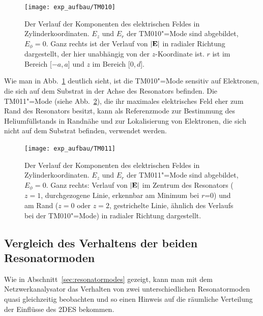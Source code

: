 \begin{figure}[h!tbp] 
	\centerline{\texttt{[image: exp\_aufbau/TM010]}}
	\caption[Modenabhängiger Feldverlauf im Resonator der TM010"=Mode]{Der Verlauf der Komponenten des elektrischen Feldes in Zylinderkoordinaten. $E_z$ und $E_r$ der TM010"=Mode sind abgebildet, $E_\phi=0$. Ganz rechts ist der Verlauf von $\abs{\vec E}$ in radialer Richtung dargestellt, der hier unabhängig von der $z$-Koordinate ist. $r$ ist im Bereich [$-a$,\,$a$] und $z$ im Bereich [$0$,\,$d$]. }
	\label{fig:TM010}
\end{figure}

Wie man in Abb.~\ref{fig:TM010} deutlich sieht, ist die TM010"=Mode sensitiv auf Elektronen, die sich auf dem Substrat in der Achse des Resonators befinden. Die TM011"=Mode (siehe Abb.~\ref{fig:TM011}), die ihr maximales elektrisches Feld eher zum Rand des Resonators besitzt, kann als Referenzmode zur Bestimmung des Heliumfüllstands in Randnähe und zur Lokalisierung von Elektronen, die sich nicht auf dem Substrat befinden, verwendet werden.

\begin{figure}[h!tbp]
	\centerline{\texttt{[image: exp\_aufbau/TM011]}}
	\caption[Modenabhängiger Feldverlauf im Resonator der TM011"=Mode]{Der Verlauf der Komponenten des elektrischen Feldes in Zylinderkoordinaten. $E_z$ und $E_r$ der TM011"=Mode sind abgebildet, $E_\phi=0$. Ganz rechts: Verlauf von $\abs{\vec E}$ im Zentrum des Resonators ($z=1$, durchgezogene Linie, erkennbar am Minimum bei $r$=0) und am Rand ($z=0$ oder $z=2$, gestrichelte Linie, ähnlich des Verlaufs bei der TM010"=Mode) in radialer Richtung dargestellt.}
	\label{fig:TM011}
\end{figure}

\subsection{Vergleich des Verhaltens der beiden Resonatormoden}
Wie in Abschnitt~\ref{sec:resonatormodes} gezeigt, kann man mit dem Netzwerkanalysator das Verhalten von zwei unterschiedlichen Resonatormoden quasi gleichzeitig beobachten und so einen Hinweis auf die räumliche Verteilung der Einflüsse des 2DES bekommen.

